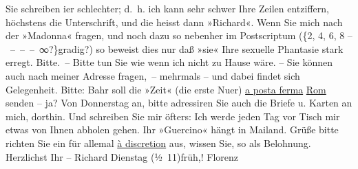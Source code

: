 \begin{ledgroupsized}[t]{13cm}
           \pstart
           Sie schreiben i{\geminationm}er schlechter; d. h. ich kann sehr
               schwer {\pb}Ihre Zeilen entziffern,
               höchstens die Unterschrift, und die heisst dann »Richard«. Wenn Sie mich nach der
               »Madonna«
               fragen, und noch dazu so nebenher im Postscriptum ({\{}2, 4, 6, 8 – – – – ∞?{\}}gradig?) so beweist dies nur daß »sie« Ihre
               sexuelle Phantasie stark erregt. Bitte. – Bitte tun Sie wie wenn ich nicht zu Hause
               wäre. – Sie können auch nach meiner Adresse fragen, – mehrmals – {\pb}und dabei findet sich
               Gelegenheit.\pend
           \pstart
           Bitte: Bahr soll die »Zeit« (die erste Nu{\geminationm}er) \uline{a posta ferma}{ }\uline{Rom} senden – ja? Von Donnerstag an, bitte adressiren Sie auch die
               Briefe u. Karten an mich, dorthin. Und schreiben Sie mir öfters: Ich werde jeden Tag
               vor Tisch mir etwas von Ihnen abholen gehen. Ihr »Guercino« hängt in Mailand. Grüße bitte richten Sie
               ein für allemal \uline{à discretion} aus, wissen Sie, so als
               Belohnung. Herzlichst Ihr –\pend
           \pstart \spacefill\mbox{Richard}\pend{}\pstart
           Dienstag{ }\introOben{}(½ 11)\introOben{}{ }früh,! Florenz\pend
           
         
         \endnumbering{}\end{ledgroupsized}  \newcommand{\dateiname}{L00375}\newcommand{\titel}{Richard Beer-Hofmann an Arthur Schnitzler, [2. 10. 1894]}\newcommand{\editorInnen}{ Martin Anton Müller und Gerd-Hermann Susen}
      